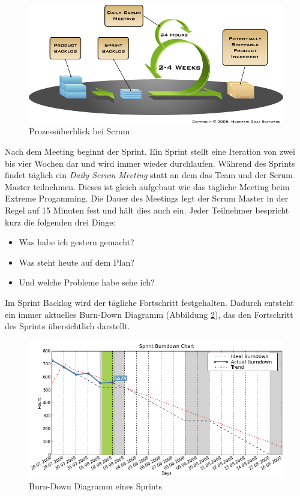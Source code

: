 \begin{figure}[h]
  \centering
  \includegraphics[width=1\textwidth]{images/scrum}
  \caption{Prozessüberblick bei Scrum \cite{bib:mountaingoat}}
  \label{fig:scrum}
\end{figure}

Nach dem Meeting beginnt der Sprint. Ein Sprint stellt eine Iteration von zwei bis vier Wochen dar und wird immer wieder durchlaufen. Während des Sprints findet täglich ein \emph{Daily Scrum Meeting} statt an dem das Team und der Scrum Master teilnehmen. Dieses ist gleich aufgebaut wie das tägliche Meeting beim Extreme Progamming. Die Dauer des Meetings legt der Scrum Master in der Regel auf 15 Minuten fest und hält dies auch ein. Jeder Teilnehmer bespricht kurz die folgenden drei Dinge: 
\begin{itemize}
  \item Was habe ich gestern gemacht? 
  \item Was steht heute auf dem Plan? 
  \item Und welche Probleme habe sehe ich?
\end{itemize}
Im Sprint Backlog wird der tägliche Fortschritt festgehalten. Dadurch entsteht ein immer aktuelles Burn-Down Diagramm (Abbildung \ref{fig:burndown}), das den Fortschritt des Sprints übersichtlich darstellt. 

\begin{figure}[h]
  \centering
  \includegraphics[width=1\textwidth]{images/burndown}
  \caption{Burn-Down Diagramm eines Sprints \cite{bib:agilo}}
  \label{fig:burndown}
\end{figure}

